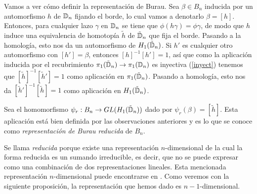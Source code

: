 \documentclass[TFG.tex]{subfiles}
\begin{document}
Vamos a ver cómo definir la representación de Burau. Sea $\beta\in B_n$ inducida por un automorfismo $h$ de $\mathbb{D}_n$ fijando el borde, lo cual vamos a denotarlo $\beta=[h]$. Entonces, para cualquier lazo $\gamma$ en $\mathbb{D}_n$ se tiene que $\phi(h\gamma)=\phi\gamma$, de modo que $h$ induce una equivalencia de homotopía \cite{Hatcher} $\tilde{h}$ de $\tilde{\mathbb{D}}_n$ que fija el borde. Pasando a la homología, esto nos da un automorfismo de $H_1(\tilde{\mathbb{D}}_n)$. Si $h'$ es cualquier otro automorfismo con $[h']=\beta$, entonces $[h]^{-1}[h']=1$, así que como la aplicación inducida por el recubrimiento $\pi_1(\tilde{\mathbb{D}}_n)\to\pi_1(\mathbb{D}_n)$ es inyectiva (\ref{inyect}) tenemos que $[\tilde{h}]^{-1}[\tilde{h}']=1$ como aplicación en $\pi_1(\tilde{\mathbb{D}}_n)$. Pasando a homología, esto nos da $[\tilde{h}']^{-1}[\tilde{h}]=1$ como aplicación en $H_1(\tilde{\mathbb{D}}_n)$. 






\begin{defi}
Sea el homomorfismo $\psi_r:B_n\to GL(H_1(\tilde{\mathbb{D}}_n))$ dado por $\psi_r(\beta)=[\tilde{h}]$. Esta aplicación está bien definida por las observaciones anteriores y es lo que se conoce como \emph{representación de Burau reducida} de $B_n$.
\end{defi}

Se llama \emph{reducida} porque existe una representación $n$-dimensional de la cual la forma reducida es un sumando irreducible, es decir, que no se puede expresar como una combinación de dos representaciones lineales. Esta mencionada representación $n$-dimensional puede encontrarse en \cite{thesis}. Como veremos con la siguiente proposición, la representación que hemos dado es $n-1$-dimensional.

\end{document}
